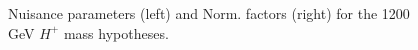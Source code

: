 \begin{figure}[H]
  \centering
  \caption{Nuisance parameters (left) and Norm. factors (right) for the 1200 GeV $H^{+}$ mass hypotheses.}
  \label{fig:Prefit_Hp1200_Blind}
\end{figure}
